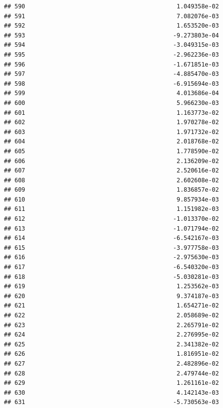 \documentclass[
]{article}
\begin{document}
\begin{verbatim}
## 590                                           1.049358e-02
## 591                                           7.082076e-03
## 592                                           1.653520e-03
## 593                                          -9.273803e-04
## 594                                          -3.049315e-03
## 595                                          -2.962236e-03
## 596                                          -1.671851e-03
## 597                                          -4.885470e-03
## 598                                          -6.915694e-03
## 599                                           4.013686e-04
## 600                                           5.966230e-03
## 601                                           1.163773e-02
## 602                                           1.970278e-02
## 603                                           1.971732e-02
## 604                                           2.018768e-02
## 605                                           1.778590e-02
## 606                                           2.136209e-02
## 607                                           2.520616e-02
## 608                                           2.602608e-02
## 609                                           1.836857e-02
## 610                                           9.857934e-03
## 611                                           1.151982e-03
## 612                                          -1.013370e-02
## 613                                          -1.071794e-02
## 614                                          -6.542167e-03
## 615                                          -3.977758e-03
## 616                                          -2.975630e-03
## 617                                          -6.540320e-03
## 618                                          -5.030281e-03
## 619                                           1.253562e-03
## 620                                           9.374187e-03
## 621                                           1.654271e-02
## 622                                           2.058689e-02
## 623                                           2.265791e-02
## 624                                           2.276995e-02
## 625                                           2.341382e-02
## 626                                           1.816951e-02
## 627                                           2.482896e-02
## 628                                           2.479744e-02
## 629                                           1.261161e-02
## 630                                           4.142143e-03
## 631                                          -5.730563e-03

\end{verbatim}
\end{document}
